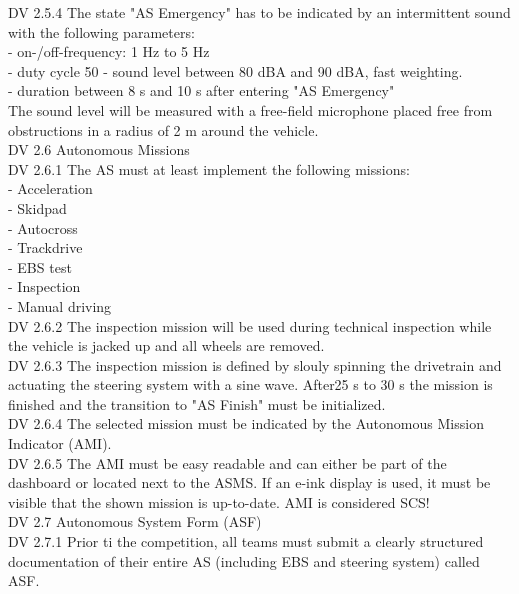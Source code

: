 \documentclass{article}
\begin{document}
DV 2.5.4 The state "AS Emergency" has to be indicated by an intermittent sound with the following parameters:\\
	- on-/off-frequency: 1 Hz to 5 Hz\\
	- duty cycle 50 %
	- sound level between 80 dBA and 90 dBA, fast weighting.\\
	- duration between 8 s and 10 s after entering "AS Emergency"\\
	The sound level will be measured with a free-field microphone placed free from obstructions in a radius of 2 m around the vehicle.\\
	
DV 2.6 Autonomous Missions\\
	
DV 2.6.1 The AS must at least implement the following missions:\\
	- Acceleration\\
	- Skidpad\\
	- Autocross\\
	- Trackdrive\\
	- EBS test\\
	- Inspection\\
	- Manual driving\\
	
DV 2.6.2 The inspection mission will be used during technical inspection while the vehicle is jacked up and all wheels are removed.\\

DV 2.6.3 The inspection mission is defined by slouly spinning the drivetrain and actuating the steering system with a sine wave. After25 s to 30 s the mission is finished and the transition to "AS Finish" must be initialized.\\

DV 2.6.4 The selected mission must be indicated by the Autonomous Mission Indicator (AMI).\\

DV 2.6.5 The AMI must be easy readable and can either be part of the dashboard or located next to the ASMS. If an e-ink display is used, it must be visible that the shown mission is up-to-date. AMI is considered SCS!\\

DV 2.7 Autonomous System Form (ASF)\\

DV 2.7.1 Prior ti the competition, all teams must submit a clearly structured documentation of their entire AS (including EBS and steering system) called ASF.\\
\end{document}
